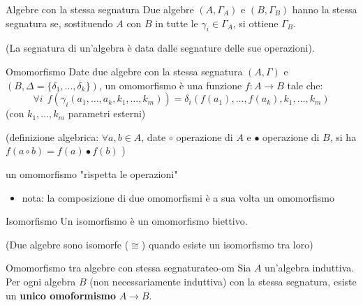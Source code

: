 \documentclass[a4paper,11pt]{report}
\begin{document}
\begin{defbox}{Algebre con la stessa segnatura}{}
    Due algebre \( (A, \Gamma_A) \) e \( (B, \Gamma_B) \) hanno la stessa segnatura se, sostituendo \( A \) con \( B \) in tutte le \( \gamma_i \in \Gamma_A \), si ottiene \( \Gamma_B \).

    (La segnatura di un'algebra è data dalle segnature delle sue operazioni).
\end{defbox}

\begin{defbox}{Omomorfismo}{}
    Date due algebre con la stessa segnatura \( (A, \Gamma) \) e \( (B, \Delta = \{\delta_1, \dots, \delta_k\} ) \), un omomorfismo è una funzione \( f: A \to B \) tale che:
    \[ \forall i \ \ f(\gamma_i (a_1, \dots, a_k, k_1, \dots, k_m)) = \delta_i (f(a_1), \dots, f(a_k), k_1, \dots, k_m)\]
    {\small(con \( k_1, \dots, k_m \) parametri esterni)}

    \vspace{0.5em}

    (definizione algebrica: \( \forall a, b \in A \), date \(\circ\) operazione di \( A \) e \(\bullet\) operazione di \( B \), si ha \( f(a \circ b) = f(a) \bullet f(b) \) )
    \vspace{0.5em}

    {\small \color{gray} un omomorfismo "rispetta le operazioni"}

    \begin{itemize}
        \item nota: la composizione di due omomorfismi è a sua volta un omomorfismo
    \end{itemize}
\end{defbox}

\begin{defbox}{Isomorfismo}{}
    Un isomorfismo è un omomorfismo biettivo.

    (Due algebre sono isomorfe (\( \cong \)) quando esiste un isomorfismo tra loro)
\end{defbox}

\begin{thmbox}{Omomorfismo tra algebre con stessa segnatura}{teo-om}
    Sia \( A \) un'algebra induttiva. Per ogni algebra \( B \) (non necessariamente induttiva) con la stessa segnatura, esiste un \textbf{unico omoformismo} \( A \to B \).

\end{thmbox}
\end{document}
